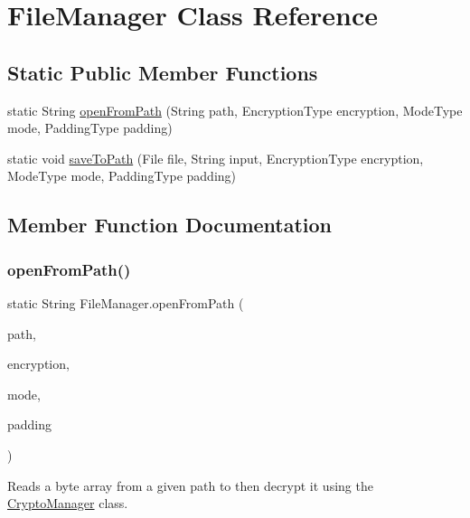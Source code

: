 \hypertarget{class_file_manager}{}\section{File\+Manager Class Reference}
\label{class_file_manager}
\subsection*{Static Public Member Functions}
\begin{DoxyCompactItemize}
\item 
static String \mbox{\hyperlink{class_file_manager_a52f2989a90be68d1632274d84a165030}{open\+From\+Path}} (String path, Encryption\+Type encryption, Mode\+Type mode, Padding\+Type padding)
\item 
static void \mbox{\hyperlink{class_file_manager_a44f1be89277979c7e729562bbedd3145}{save\+To\+Path}} (File file, String input, Encryption\+Type encryption, Mode\+Type mode, Padding\+Type padding)
\end{DoxyCompactItemize}


\subsection{Member Function Documentation}
\mbox{\label{class_file_manager_a52f2989a90be68d1632274d84a165030}} 
\subsubsection{\texorpdfstring{open\+From\+Path()}{openFromPath()}}
{\footnotesize\ttfamily static String File\+Manager.\+open\+From\+Path (\begin{DoxyParamCaption}\item[{String}]{path,  }\item[{Encryption\+Type}]{encryption,  }\item[{Mode\+Type}]{mode,  }\item[{Padding\+Type}]{padding }\end{DoxyParamCaption})\hspace{0.3cm}{\ttfamily [static]}}

Reads a byte array from a given path to then decrypt it using the \mbox{\hyperlink{class_crypto_manager}{Crypto\+Manager}} class.


